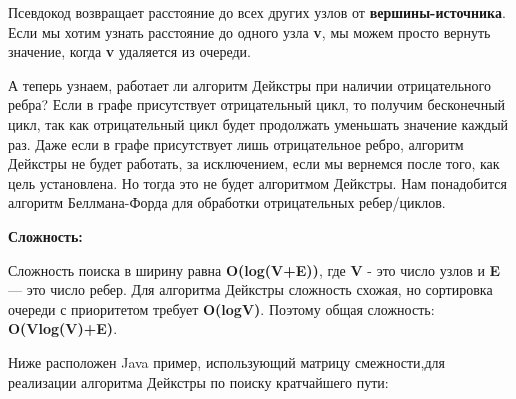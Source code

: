 \vspace{\baselineskip}
Псевдокод возвращает расстояние до всех других узлов от\textbf{ вершины-источника}. Если мы хотим узнать расстояние до одного узла \textbf{v}, мы можем просто вернуть значение, когда \textbf{v} удаляется из очереди.

\vspace{\baselineskip}
А теперь узнаем, работает ли алгоритм Дейкстры при наличии отрицательного ребра? Если в графе присутствует отрицательный цикл, то получим бесконечный цикл, так как отрицательный цикл будет продолжать уменьшать значение каждый раз. Даже если в графе присутствует лишь отрицательное ребро, алгоритм Дейкстры не будет работать, за исключением, если мы вернемся после того, как цель установлена. Но тогда это не будет алгоритмом Дейкстры. Нам понадобится алгоритм Беллмана-Форда для обработки отрицательных ребер/циклов.

\vspace{\baselineskip}
\textbf{Сложность:}

\vspace{\baselineskip}
Сложность поиска в ширину равна\textbf{ O(log(V+E))}, где \textbf{V} - это число узлов и \textbf{E} --- это число ребер. Для алгоритма Дейкстры сложность схожая, но сортировка очереди с приоритетом требует \textbf{O(logV)}. Поэтому общая сложность: \textbf{O(Vlog(V)+E)}.

\vspace{\baselineskip}
Ниже расположен Java пример, использующий матрицу смежности,для реализации алгоритма Дейкстры по поиску кратчайшего пути:


